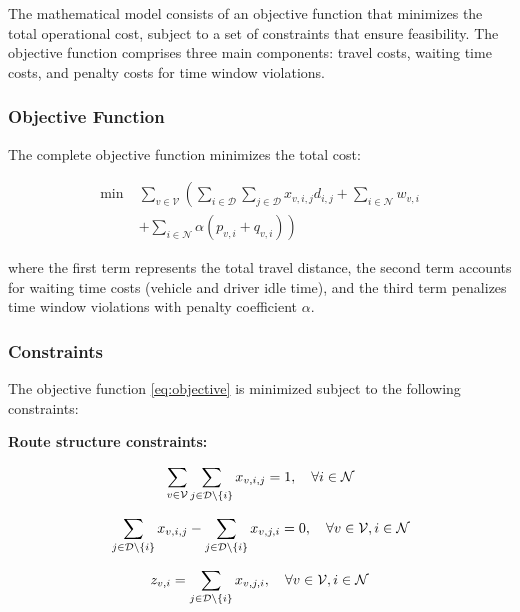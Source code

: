 The mathematical model consists of an objective function that minimizes the total operational cost, subject to a set of constraints that ensure feasibility. The objective function comprises three main components: travel costs, waiting time costs, and penalty costs for time window violations.

\subsubsection{Objective Function}

The complete objective function minimizes the total cost:

\begin{equation}\label{eq:objective}
\begin{aligned}
    \min \; & \sum_{v \in \mathcal{V}} \left( 
         \sum_{i \in \mathcal{D}} \sum_{j \in \mathcal{D}}  x_{v,i,j} d_{i,j} 
        +  \sum_{i \in \mathcal{N}} w_{v,i} \right. \\
    & \left. 
        + \sum_{i \in \mathcal{N}} \alpha (p_{v,i} + q_{v,i}) 
    \right)
\end{aligned}
\end{equation}


where the first term represents the total travel distance, the second term accounts for waiting time costs (vehicle and driver idle time), and the third term penalizes time window violations with penalty coefficient $\alpha$.

\subsubsection{Constraints}

The objective function \ref{eq:objective} is minimized subject to the following constraints:

\textbf{Route structure constraints:}

\begin{equation}{\label{eq:one_visit}}
     \sum_{v \in \mathcal{V}}\sum_{j \in \mathcal{D}\setminus \{i\}} x_{v,i,j}=1, \quad \forall i \in \mathcal{N}
\end{equation}

\begin{equation}{\label{eq:flow_balance}}
    \sum_{j\in\mathcal{D}\setminus\{i\}}x_{v,i,j}-\sum_{j\in\mathcal{D}\setminus\{i\}}x_{v,j,i}=0, \quad \forall v \in \mathcal{V}, i \in \mathcal{N}
\end{equation}

\begin{equation}{\label{eq:edgevisitcorrelation}}
    z_{v,i} = \sum_{j\in \mathcal{D}\setminus\{i\}}x_{v,j,i}, \quad \forall v \in \mathcal{V}, i \in \mathcal{N}
\end{equation}


